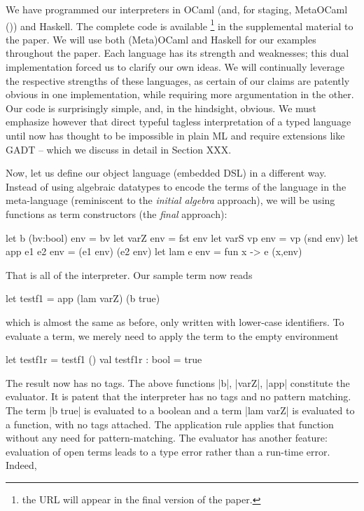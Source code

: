 \documentclass[preprint]{sigplanconf}
\let\cite=\citep
\begin{document}
We have programmed our interpreters in OCaml (and, for staging,
MetaOCaml (\cite{metaocaml})) and Haskell. The complete code is available 
\footnote{the URL will appear in the final version of the paper.}
in the supplemental material to the paper. We will use both
(Meta)OCaml and Haskell for our examples throughout the paper.
Each language has its strength and weaknesses; this dual implementation
forced us to clarify our own ideas.  We will continually leverage the
respective strengths of these languages, as certain of our claims are
patently obvious in one implementation, while requiring more argumentation
in the other.
Our code is surprisingly simple, and, in the hindsight, obvious. We
must emphasize however that direct typeful tagless interpretation of a typed
language until now has thought to be impossible in plain ML and
require extensions like GADT -- which we discuss in detail in Section
XXX.

Now, let us define our object language (embedded DSL) in a different
way. Instead of using algebraic datatypes to encode the terms of the
language in the meta-language (reminiscent to the \emph{initial algebra} 
approach), we will be using functions as term constructors (the \emph{final}
approach):

\begin{code}
  let b (bv:bool) env  = bv
  let varZ env         = fst env
  let varS vp env      = vp (snd env)
  let app e1 e2 env    = (e1 env) (e2 env)
  let lam e env        = fun x -> e (x,env)
\end{code}

\noindent That is all of the interpreter. Our sample term now reads
\begin{code}
  let testf1 = app (lam varZ) (b true)
\end{code}
which is almost the same as before, only written with lower-case
identifiers. To evaluate a term, we merely need to apply 
the term to the empty environment

\begin{code}
  let testf1r = testf1 ()
  val testf1r : bool = true
\end{code}

The result now has no tags. The above functions |b|,
|varZ|, |app| constitute the evaluator. It is patent that the
interpreter has no tags and no pattern matching. The term |b true| is
evaluated to a boolean and a term |lam varZ| is evaluated to a
function, with no tags attached. The application rule applies that
function without any need for pattern-matching. The evaluator has
another feature: evaluation of open terms leads to a type error rather
than a run-time error. Indeed, 
\end{document}
